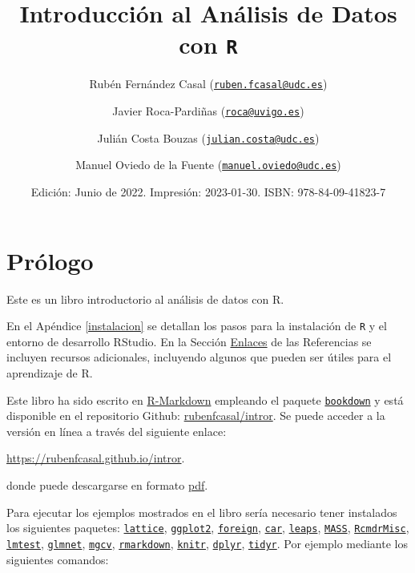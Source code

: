 \documentclass[
]{book}
\title{Introducción al Análisis de Datos con \texttt{R}}
\author{Rubén Fernández Casal (\href{mailto:ruben.fcasal@udc.es}{\nolinkurl{ruben.fcasal@udc.es}}) \and Javier Roca-Pardiñas (\href{mailto:roca@uvigo.es}{\nolinkurl{roca@uvigo.es}}) \and Julián Costa Bouzas (\href{mailto:julian.costa@udc.es}{\nolinkurl{julian.costa@udc.es}}) \and Manuel Oviedo de la Fuente (\href{mailto:manuel.oviedo@udc.es}{\nolinkurl{manuel.oviedo@udc.es}})}
\date{Edición: Junio de 2022. Impresión: 2023-01-30. ISBN: 978-84-09-41823-7}
\theoremstyle{break}
\theoremstyle{nonumberplain}
\begin{document}
\maketitle

{
\setcounter{tocdepth}{1}
\tableofcontents
}
\hypertarget{pruxf3logo}{%
\chapter*{Prólogo}\label{pruxf3logo}}

Este es un libro introductorio al análisis de datos con R.

En el Apéndice \ref{instalacion} se detallan los pasos para la instalación de \texttt{R} y el entorno de desarrollo RStudio.
En la Sección \protect\hyperlink{links}{Enlaces} de las Referencias se incluyen recursos adicionales, incluyendo algunos que pueden ser útiles para el aprendizaje de R.

Este libro ha sido escrito en \href{http://rmarkdown.rstudio.com}{R-Markdown} empleando el paquete \href{https://bookdown.org/yihui/bookdown/}{\texttt{bookdown}} y está disponible en el repositorio Github: \href{https://github.com/rubenfcasal/book_remuestreo}{rubenfcasal/intror}.
Se puede acceder a la versión en línea a través del siguiente enlace:

\url{https://rubenfcasal.github.io/intror}.

donde puede descargarse en formato \href{https://rubenfcasal.github.io/intror/Intro_Analisis_Datos_R.pdf}{pdf}.

Para ejecutar los ejemplos mostrados en el libro sería necesario tener instalados los siguientes paquetes:
\href{https://CRAN.R-project.org/package=lattice}{\texttt{lattice}}, \href{https://CRAN.R-project.org/package=ggplot2}{\texttt{ggplot2}}, \href{https://CRAN.R-project.org/package=foreign}{\texttt{foreign}}, \href{https://CRAN.R-project.org/package=car}{\texttt{car}}, \href{https://CRAN.R-project.org/package=leaps}{\texttt{leaps}}, \href{https://CRAN.R-project.org/package=MASS}{\texttt{MASS}}, \href{https://CRAN.R-project.org/package=RcmdrMisc}{\texttt{RcmdrMisc}}, \href{https://CRAN.R-project.org/package=lmtest}{\texttt{lmtest}}, \href{https://CRAN.R-project.org/package=glmnet}{\texttt{glmnet}}, \href{https://CRAN.R-project.org/package=mgcv}{\texttt{mgcv}}, \href{https://CRAN.R-project.org/package=rmarkdown}{\texttt{rmarkdown}}, \href{https://CRAN.R-project.org/package=knitr}{\texttt{knitr}}, \href{https://CRAN.R-project.org/package=dplyr}{\texttt{dplyr}}, \href{https://CRAN.R-project.org/package=tidyr}{\texttt{tidyr}}.
Por ejemplo mediante los siguientes comandos:
\end{document}

